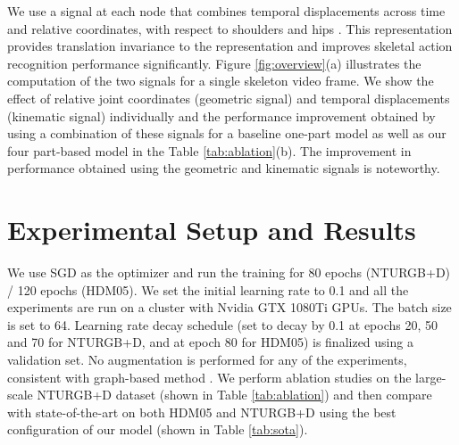 \documentclass{bmvc2k}
\begin{document}
We use a signal at each node that combines temporal displacements across time and relative coordinates, with respect to shoulders and hips \cite{ke2017new}.  This representation provides translation invariance to the representation \cite{verma2018feastnet} and improves skeletal action recognition performance significantly. Figure \ref{fig:overview}(a) illustrates the computation of the two signals for a single skeleton video frame. We show the effect of relative joint coordinates (geometric signal) and temporal displacements (kinematic signal) individually and the performance improvement obtained by using a combination of these signals for a baseline one-part model as well as our four part-based model in the Table \ref{tab:ablation}(b). The improvement in performance obtained using the geometric and kinematic signals is noteworthy.

\section{Experimental Setup and Results}
\label{sec:exp_res}
We use SGD as the optimizer and run the training for 80 epochs (NTURGB+D) / 120 epochs (HDM05). We set the initial learning rate to 0.1 and all the experiments are run on a cluster with  Nvidia GTX 1080Ti GPUs. The batch size is set to 64. Learning rate decay schedule (set to decay by 0.1 at epochs 20, 50 and 70 for NTURGB+D, and at epoch 80 for HDM05) is finalized using a validation set. No augmentation is performed for any of the experiments, consistent with graph-based method \cite{yan2018spatial}. We perform ablation studies on the large-scale NTURGB+D dataset (shown in Table \ref{tab:ablation}) and then compare with state-of-the-art on both HDM05 and NTURGB+D using the best configuration of our model (shown in Table \ref{tab:sota}).
\end{document}
